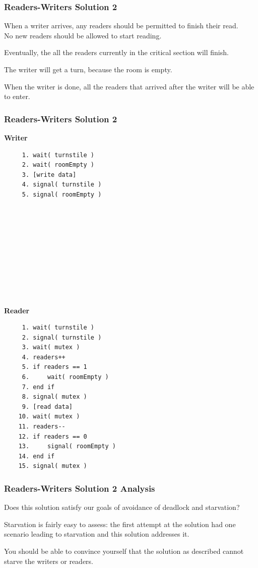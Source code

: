 \begin{frame}
\frametitle{Readers-Writers Solution 2}

When a writer arrives, any readers should be permitted to finish their read.\\
\quad No new readers should be allowed to start reading. 

Eventually, the all the readers currently in the critical section will finish. 

The writer will get a turn, because the room is empty.

When the writer is done, all the readers that arrived after the writer will be able to enter.

\end{frame}


\begin{frame}[fragile]
\frametitle{Readers-Writers Solution 2}
\begin{multicols}{2}
\textbf{Writer}
  \begin{verbatim}
	 1. wait( turnstile )
	 2. wait( roomEmpty )
	 3. [write data]
	 4. signal( turnstile )
	 5. signal( roomEmpty )
	 
	 
	 
	 
	 
	 
	 
	 
	 
	 
  \end{verbatim}
\columnbreak
\textbf{Reader}
  \begin{verbatim}
	 1. wait( turnstile )
	 2. signal( turnstile )
	 3. wait( mutex )
	 4. readers++
	 5. if readers == 1
	 6.     wait( roomEmpty )
	 7. end if
	 8. signal( mutex )
	 9. [read data]
	10. wait( mutex )
	11. readers--
	12. if readers == 0
	13.     signal( roomEmpty )
	14. end if
	15. signal( mutex )
  \end{verbatim}
\end{multicols}

\end{frame}


\begin{frame}
\frametitle{Readers-Writers Solution 2 Analysis}

Does this solution satisfy our goals of avoidance of deadlock and starvation? 

Starvation is fairly easy to assess: the first attempt at the solution had one scenario leading to starvation and this solution addresses it. 

You should be able to convince yourself that the solution as described cannot starve the writers or readers.


\end{frame}


